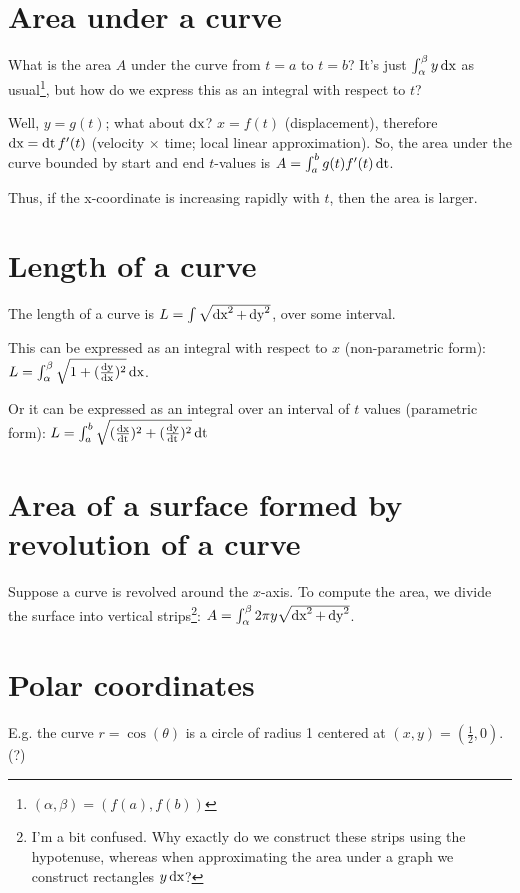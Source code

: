 \documentclass[12pt]{article}
\begin{document}
\section*{Area under a curve}

What is the area $A$ under the curve from $t=a$ to $t=b$? It's just
$\int_\alpha^\beta y \operatorname{\text{dx}}$ as usual\footnote{$(\alpha, \beta) = (f(a), f(b))$},
but how do we express this as an integral with respect to $t$?

Well, $y = g(t)$; what about $\operatorname{\text{dx}}$? $x = f(t)$ (displacement), therefore
$\operatorname{\text{dx}} = \operatorname{\text{dt}} f'(t)$ (velocity $\times$ time; local linear approximation). So, the
area under the curve bounded by start and end $t$-values is
$A = \int_a^b g(t) f'(t) \operatorname{\text{dt}}$.

Thus, if the x-coordinate is increasing rapidly with $t$, then the area is
larger.

\section*{Length of a curve}

The length of a curve is $L = \int \sqrt{\operatorname{\text{dx}}^2 + \operatorname{\text{dy}}^2}$, over some interval.

This can be expressed as an integral with respect to $x$ (non-parametric form):
$L = \int_\alpha^\beta \sqrt{1 + (\frac{\operatorname{\text{dy}}}{\operatorname{\text{dx}}})^2} \operatorname{\text{dx}}$.

Or it can be expressed as an integral over an interval of $t$ values (parametric form):
$L = \int_a^b \sqrt{ (\frac{\operatorname{\text{dx}}}{\operatorname{\text{dt}}})^2 + (\frac{\operatorname{\text{dy}}}{\operatorname{\text{dt}}})^2} \operatorname{\text{dt}}$

\section*{Area of a surface formed by revolution of a curve}

Suppose a curve is revolved around the $x$-axis. To compute the area, we divide
the surface into vertical strips\footnote{I'm a bit confused. Why exactly do we
  construct these strips using the hypotenuse, whereas when approximating the
  area under a graph we construct rectangles $y\operatorname{\text{dx}}$?}:
$A = \int_\alpha^\beta 2\pi y \sqrt{\operatorname{\text{dx}}^2 + \operatorname{\text{dy}}^2}$.


\section*{Polar coordinates}

E.g. the curve $r = \cos(\theta)$ is a circle of radius 1 centered at $(x, y) = (\frac{1}{2}, 0)$. (?)
\end{document}
